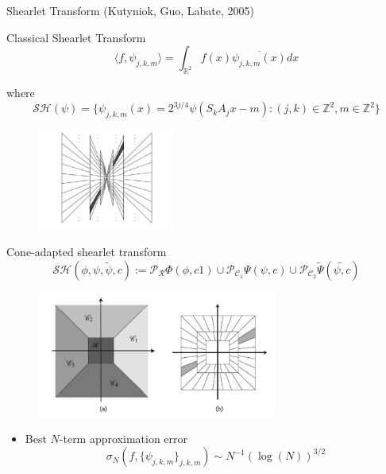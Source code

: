 \begin{frame}{Shearlet Transform (Kutyniok, Guo, Labate, 2005)}
\begin{block}{Classical Shearlet Transform}
$$
\langle f,\psi_{j,k,m}\rangle =\int_{\mathbb{R}^2}f(x)\overline{\psi_{j,k,m}(x)}dx
$$

where
$$
\mathcal{SH}(\psi)=\{\psi_{j,k,m}(x)=2^{3j/4}\psi (S_kA_jx-m):(j,k)\in\mathbb{Z}^2,m\in\mathbb{Z}^2\}
$$
\end{block}

\begin{figure}[h!]
\centering
\includegraphics[width=0.4\textwidth]{./Images/tiling_nocone.jpg}
\end{figure}
\end{frame}

\begin{frame}{Cone-adapted shearlet transform}
$$
\mathcal{SH}(\phi,\psi,\tilde{\psi},c):=\mathcal{P}_{\mathcal{R}}\Phi(\phi,c1)\cup\mathcal{P}_{\mathcal{C}_1}\Psi(\psi,c)\cup\mathcal{P}_{\mathcal{C}_2}\tilde{\Psi}(\tilde{\psi,c})
$$

\begin{figure}[h!]
\centering
\includegraphics[width=0.7\textwidth]{./Images/tiling_cone}
\end{figure}

\pause
\begin{itemize}
\item Best $N$-term approximation error
$$
\sigma_N(f,\{\psi_{j,k,m}\}_{j,k,m})\sim N^{-1}(\log(N))^{3/2}
$$
\end{itemize}
\end{frame}


